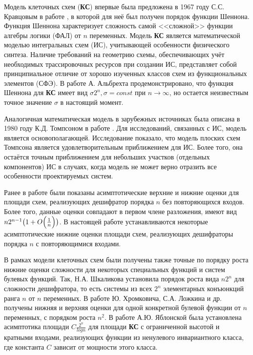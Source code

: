 Модель клеточных схем (\textbf{КС}) впервые была предложена в 1967 году С.С. Кравцовым в работе \cite{Kravcov}, в которой для неё был получен порядок функции Шеннона. Функция Шеннона характеризует сложность самой <<сложной>> функции алгебры логики (ФАЛ) от $n$ переменных. Модель \textbf{КС} является математической моделью интегральных схем (ИС), учитывающей особенности физического синтеза. Наличие требований на геометрию схемы, обеспечивающих учёт необходимых трассировочных ресурсов при создании ИС, представляет собой принципиальное отличие от хорошо изученных классов схем из функциональных элементов (СФЭ).
В работе А. Альбрехта \cite{Albrecht} продемонстрировано, что функция Шеннона для \textbf{КС} имеет вид $\sigma2^n, \sigma = const$ при $n \to \infty$, но остается неизвестным точное значение $\sigma$ в настоящий момент.

Аналогичная математическая модель в зарубежных источниках была описана в 1980 году К.Д. Томпсоном в работе \cite{Thompson}. Для исследований, связанных с ИС, модель является основополагающей. Исследование \cite{Chazelle} показало, что модель плоских схем Томпсона является удовлетворительным приближением для ИС.%
Более того, она остаётся точным приближением для небольших участков (отдельных компонентов) ИС в случаях, когда модель не может верно отразить все особенности проектируемых систем.

Ранее в работе \cite{Kazan} были показаны асимптотические верхние и нижние оценки для площади схем, реализующих дешифратор порядка $n$ без повторяющихся входов. Более того, данные оценки совпадают в первом члене разложения, имеют вид $n2^{n-1}\bigl(1 + O\Bigl(\frac{1}{n}\Bigr)\bigr)$. В настоящей работе устанавливаются некоторые асимптотические нижние оценки площади схем, реализующих дешифраторы порядка $n$ с повторяющимися входами.

В рамках модели клеточных схем были получены также точные по порядку роста нижние оценки сложности для некоторых специальных функций и систем булевых функций. Так, Н.А. Шкаликова установила \cite{Shkalikova} порядок роста вида $n2^n$ для сложности дешифратора, то есть системы из всех $2^n$ элементарных конъюнкций ранга $n$ от $n$ переменных. В работе Ю. Хромковича, С.А. Ложкина и др. \cite{Lozhkin} получены нижняя и верхняя оценки для одной конкретной булевой функции от $n$ переменных, с порядком роста $n^2$. В работе А.Ю. Яблонской \cite{Yablonskaja} была установлена асимптотика площади $C \frac{2^n}{log n}$ для площади \textbf{КС} с ограниченной высотой и кратными входами, реализующих функции из ненулевого инвариантного класса, где константа $C$ зависит от мощности этого класса.

